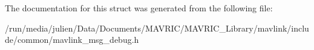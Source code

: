 The documentation for this struct was generated from the following file\+:\begin{DoxyCompactItemize}
\item 
/run/media/julien/\+Data/\+Documents/\+M\+A\+V\+R\+I\+C/\+M\+A\+V\+R\+I\+C\+\_\+\+Library/mavlink/include/common/mavlink\+\_\+msg\+\_\+debug.\+h\end{DoxyCompactItemize}
